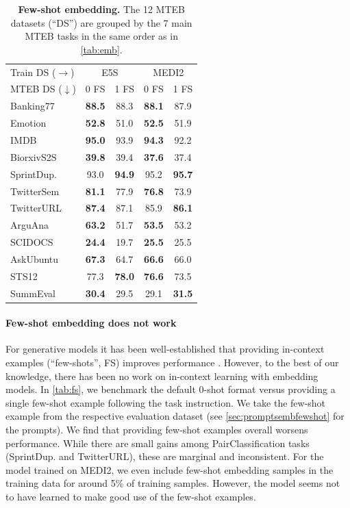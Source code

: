 \documentclass{article}
\begin{document}
\begin{table}
\vspace{-1.5em}
\caption{\textbf{Few-shot embedding.} The 12 MTEB datasets (``DS'') are grouped by the 7 main MTEB tasks in the same order as in \autoref{tab:emb}.}
\begin{tabular}{l|cc|cc}
\toprule
Train DS ($\rightarrow$) & \multicolumn{2}{c}{E5S} & \multicolumn{2}{c}{MEDI2} \\
MTEB DS ($\downarrow$) & 0 FS & 1 FS & 0 FS & 1 FS \\
\midrule
Banking77 & \textbf{88.5} & 88.3 & \textbf{88.1} & 87.9 \\
Emotion & \textbf{52.8} & 51.0 & \textbf{52.5} & 51.9 \\
IMDB & \textbf{95.0} & 93.9 & \textbf{94.3} & 92.2 \\
\midrule
BiorxivS2S & \textbf{39.8} & 39.4 & \textbf{37.6} & 37.4 \\
\midrule
SprintDup. & 93.0 & \textbf{94.9} & 95.2 & \textbf{95.7} \\
TwitterSem & \textbf{81.1} & 77.9 & \textbf{76.8} & 73.9 \\
TwitterURL & \textbf{87.4} & 87.1 & 85.9 & \textbf{86.1} \\
\midrule
ArguAna & \textbf{63.2} & 51.7 & \textbf{53.5} & 53.2 \\
SCIDOCS & \textbf{24.4} & 19.7 & \textbf{25.5} & 25.5 \\
\midrule
AskUbuntu & \textbf{67.3} & 64.7 & \textbf{66.6} & 66.0 \\
\midrule
STS12 & 77.3 & \textbf{78.0} & \textbf{76.6} & 73.5 \\
\midrule
SummEval & \textbf{30.4} & 29.5 & 29.1 & \textbf{31.5} \\
\bottomrule
\end{tabular}
\label{tab:fs}
\vspace{-2em}
\end{table}

\paragraph{Few-shot embedding does not work} For generative models it has been well-established that providing in-context examples (``few-shots'', FS) improves performance \cite{brown2020language}. However, to the best of our knowledge, there has been no work on in-context learning with embedding models. In \autoref{tab:fs}, we benchmark the default 0-shot format versus providing a single few-shot example following the task instruction. We take the few-shot example from the respective evaluation dataset (see \autoref{sec:promptsembfewshot} for the prompts). We find that providing few-shot examples overall worsens performance. While there are small gains among PairClassification tasks (SprintDup. and TwitterURL), these are marginal and inconsistent. For the model trained on MEDI2, we even include few-shot embedding samples in the training data for around 5\% of training samples. However, the model seems not to have learned to make good use of the few-shot examples.\\
\end{document}
